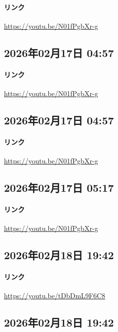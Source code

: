 \paragraph{リンク}
\url{https://youtu.be/N01fPgbXr-g}

\subsection*{2026年02月17日 04:57}

\paragraph{リンク}
\url{https://youtu.be/N01fPgbXr-g}

\subsection*{2026年02月17日 04:57}

\paragraph{リンク}
\url{https://youtu.be/N01fPgbXr-g}

\subsection*{2026年02月17日 05:17}

\paragraph{リンク}
\url{https://youtu.be/N01fPgbXr-g}

\subsection*{2026年02月18日 19:42}

\paragraph{リンク}
\url{https://youtu.be/tDbDmL9F6C8}

\subsection*{2026年02月18日 19:42}

